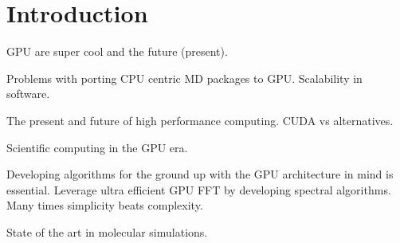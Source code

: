 \chapter{Introduction}\label{ch:introduction}

\gls{GPU} are super cool and the future (present).

Problems with porting CPU centric \gls{MD} packages to \gls{GPU}. Scalability in software.

The present and future of high performance computing.
CUDA vs alternatives.

Scientific computing in the GPU era.

Developing algorithms for the ground up with the GPU architecture in mind is essential. Leverage ultra efficient \gls{GPU} \gls{FFT} by developing spectral algorithms. Many times simplicity beats complexity.

State of the art in molecular simulations.



